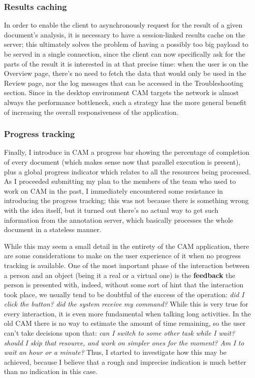 \documentclass[12pt,svgnames]{memoir}
\begin{document}
\subsubsection*{Results caching}\label{results-caching}

In order to enable the client to asynchronously request for the result
of a given document's analysis, it is necessary to have a session-linked
results cache on the server; this ultimately solves the problem of
having a possibly too big payload to be served in a single connection,
since the client can now specifically ask for the parts of the result it
is interested in at that precise time: when the user is on the Overview
page, there's no need to fetch the data that would only be used in the
Review page, nor the log messages that can be accessed in the
Troubleshooting section. Since in the desktop environment CAM targets
the network is almost always the performance bottleneck, such a strategy
has the more general benefit of increasing the overall responsiveness of
the application.

\subsubsection*{Progress tracking}\label{progress-tracking}

Finally, I introduce in CAM a progress bar showing the percentage of
completion of every document (which makes sense now that parallel
execution is present), plus a global progress indicator which relates to
all the resources being processed. As I proceeded submitting my plan to
the members of the team who used to work on CAM in the past, I
immediately encountered some resistance in introducing the progress
tracking; this was not because there is something wrong with the idea
itself, but it turned out there's no actual way to get such information
from the annotation server, which basically processes the whole document
in a stateless manner.

While this may seem a small detail in the entirety of the CAM
application, there are some considerations to make on the user
experience of it when no progress tracking is available. One of the most
important phase of the interaction between a person and an object (being
it a real or a virtual one) is the \textbf{feedback} the person is
presented with, indeed, without some sort of hint that the interaction
took place, we usually tend to be doubtful of the success of the
operation: \emph{did I click the button? did the system receive my
command?} While this is very true for every interaction, it is even more
fundamental when talking long activities. In the old CAM there is no way
to estimate the amount of time remaining, so the user can't take
decisions upon that: \emph{can I switch to some other task while I wait?
should I skip that resource, and work on simpler ones for the moment? Am
I to wait an hour or a minute?} Thus, I started to investigate how this
may be achieved, because I believe that a rough and imprecise indication
is much better than no indication in this case.
\end{document}
